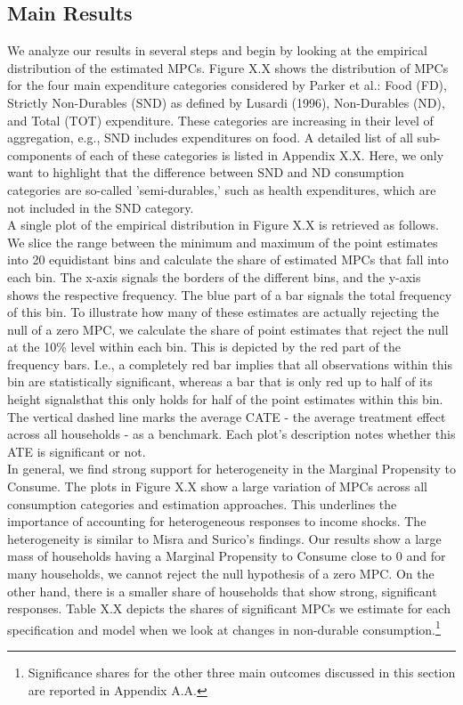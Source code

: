\subsection{Main Results}
We analyze our results in several steps and begin by looking at the empirical distribution of the estimated MPCs. Figure X.X shows the distribution of MPCs for the four main expenditure categories considered by Parker et al.: Food (FD), Strictly Non-Durables (SND) as defined by Lusardi (1996), Non-Durables (ND), and Total (TOT) expenditure. These categories are increasing in their level of aggregation, e.g., SND includes expenditures on food. A detailed list of all sub-components of each of these categories is listed in Appendix X.X. Here, we only want to highlight that the difference between SND and ND consumption categories are so-called 'semi-durables,' such as health expenditures, which are not included in the SND category. \\
A single plot of the empirical distribution in Figure X.X is retrieved as follows. We slice the range between the minimum and maximum of the point estimates into 20 equidistant bins and calculate the share of estimated MPCs that fall into each bin. The x-axis signals the borders of the different bins, and the y-axis shows the respective frequency. The blue part of a bar signals the total frequency of this bin. To illustrate how many of these estimates are actually rejecting the null of a zero MPC, we calculate the share of point estimates that reject the null at the 10\% level within each bin. This is depicted by the red part of the frequency bars. I.e., a completely red bar implies that all observations within this bin are statistically significant, whereas a bar that is only red up to half of its height signalsthat this only holds for half of the point estimates within this bin. The vertical dashed line marks the average CATE - the average treatment effect across all households - as a benchmark. Each plot's description notes whether this ATE is significant or not. \\ 
In general, we find strong support for heterogeneity in the Marginal Propensity to Consume. The plots in Figure X.X show a large variation of MPCs across all consumption categories and estimation approaches. This underlines the importance of accounting for heterogeneous responses to income shocks. The heterogeneity is similar to Misra and Surico’s findings. Our results show a large mass of households having a Marginal Propensity to Consume close to 0 and for many households, we cannot reject the null hypothesis of a zero MPC. On the other hand, there is a smaller share of households that show strong, significant responses. Table X.X depicts the shares of significant MPCs we estimate for each specification and model when we look at changes in non-durable consumption.\footnote{Significance shares for the other three main outcomes discussed in this section are reported in Appendix A.A.} \\
